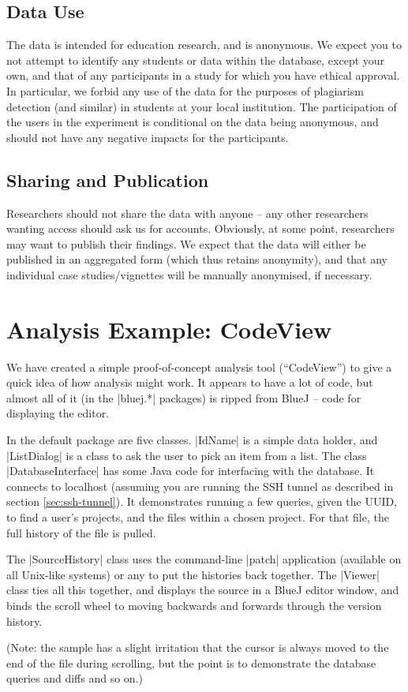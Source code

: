 \documentclass{report}
\begin{document}
\section{Data Use}

The data is intended for education research, and is anonymous.  We expect you
to not attempt to identify any students or data within the database, except
your own, and that of any participants in a study for which you have ethical
approval.  In particular, we forbid any use of the data for the purposes of
plagiarism detection (and similar) in students at your local institution.  The
participation of the users in the experiment is conditional on the data being
anonymous, and should not have any negative impacts for the participants.

\section{Sharing and Publication}

Researchers should not share the data with anyone -- any other researchers
wanting access should ask us for accounts.  Obviously, at some point,
researchers may want to publish their findings.  We expect that the data will
either be published in an aggregated form (which thus retains anonymity), and
that any individual case studies/vignettes will be manually anonymised, if
necessary.

\chapter{Analysis Example: CodeView}
\label{sec:example_codeview}

We have created a simple proof-of-concept analysis tool (``CodeView'') to give a quick idea
of how analysis might work.  It appears to have a lot of code, but almost all
of it (in the |bluej.*| packages) is ripped from BlueJ -- code for displaying
the editor.

In the default package are five classes.  |IdName| is a simple data holder,
and |ListDialog| is a class to ask the user to pick an item from a list.  The
class |DatabaseInterface| has some Java code for interfacing with the
database.  It connects to localhost (assuming you are running the SSH tunnel
as described in section \ref{sec:ssh-tunnel}).  It demonstrates running a few
queries, given the UUID, to find a user's projects, and the files within a
chosen project.  For that file, the full history of the file is pulled.

The |SourceHistory| class uses the command-line |patch| application (available on all Unix-like systems) or any
to put the histories back together.  The |Viewer| class ties all this
together, and displays the source in a BlueJ editor window, and binds the
scroll wheel to moving backwards and forwards through the version history.

(Note: the sample has a slight irritation that the cursor is always moved to the end
of the file during scrolling, but the point is to demonstrate the database
queries and diffs and so on.)
\end{document}
